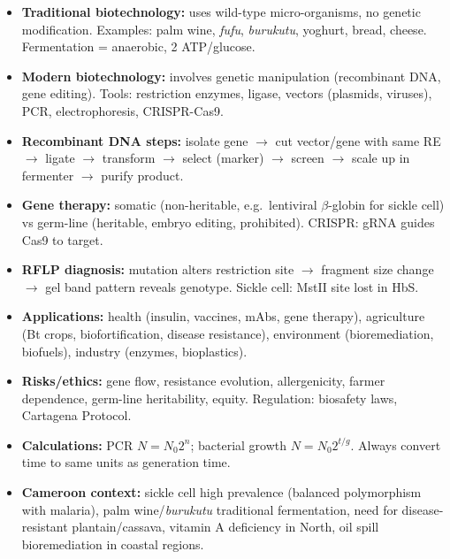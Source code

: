 \documentclass[11pt]{article}
\begin{document}
\begin{aretenir}
\begin{itemize}
\item \textbf{Traditional biotechnology:} uses wild-type micro-organisms, no genetic modification. Examples: palm wine, \emph{fufu}, \emph{burukutu}, yoghurt, bread, cheese. Fermentation = anaerobic, 2 ATP/glucose.
\item \textbf{Modern biotechnology:} involves genetic manipulation (recombinant DNA, gene editing). Tools: restriction enzymes, ligase, vectors (plasmids, viruses), PCR, electrophoresis, CRISPR-Cas9.
\item \textbf{Recombinant DNA steps:} isolate gene $\rightarrow$ cut vector/gene with same RE $\rightarrow$ ligate $\rightarrow$ transform $\rightarrow$ select (marker) $\rightarrow$ screen $\rightarrow$ scale up in fermenter $\rightarrow$ purify product.
\item \textbf{Gene therapy:} somatic (non-heritable, e.g.\ lentiviral $\beta$-globin for sickle cell) vs germ-line (heritable, embryo editing, prohibited). CRISPR: gRNA guides Cas9 to target.
\item \textbf{RFLP diagnosis:} mutation alters restriction site $\rightarrow$ fragment size change $\rightarrow$ gel band pattern reveals genotype. Sickle cell: MstII site lost in HbS.
\item \textbf{Applications:} health (insulin, vaccines, mAbs, gene therapy), agriculture (Bt crops, biofortification, disease resistance), environment (bioremediation, biofuels), industry (enzymes, bioplastics).
\item \textbf{Risks/ethics:} gene flow, resistance evolution, allergenicity, farmer dependence, germ-line heritability, equity. Regulation: biosafety laws, Cartagena Protocol.
\item \textbf{Calculations:} PCR $N = N_0 2^n$; bacterial growth $N = N_0 2^{t/g}$. Always convert time to same units as generation time.
\item \textbf{Cameroon context:} sickle cell high prevalence (balanced polymorphism with malaria), palm wine/\emph{burukutu} traditional fermentation, need for disease-resistant plantain/cassava, vitamin A deficiency in North, oil spill bioremediation in coastal regions.
\end{itemize}
\end{aretenir}
\end{document}
